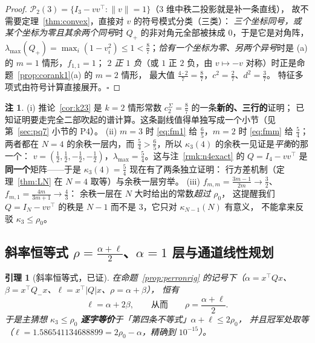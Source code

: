 \documentclass[UTF8,11pt]{ctexart}
\newtheorem{lemma}[theorem]{引理}
\theoremstyle{definition}
\newtheorem{remark}[theorem]{注}
\begin{document}
\begin{proof}
$\mathcal P_2(3)=\{I_3-vv^\top:\|v\|=1\}$（$3$ 维中秩二投影就是补一条直线），
故不需要定理~\ref{thm:convex}，直接对 $v$ 的符号模式分类（三类）：
\emph{三个坐标同号，或某个坐标为零且其余两个同号}时 $Q_+$ 的非对角元全部被抹成 $0$，于是它是对角阵，
$\lambda_{\max}(Q_+)=\max_i(1-v_i^2)\le1<\frac87$；\emph{恰有一个坐标为零、另两个异号}时是 (a) 的 $m=1$ 情形，$f_{1,1}=1$；
\emph{$2$ 正 $1$ 负}（或 $1$ 正 $2$ 负，由 $v\mapsto-v$ 对称）时正是命题~\ref{prop:corank1}(a) 的 $m=2$ 情形，
最大值 $\frac{4\cdot2}{7}=\frac87$，$c^2=\frac27$、$d^2=\frac37$。
特征多项式由符号计算直接展开。$\square$
\end{proof}

\begin{remark}\label{rmk:k23read}
(i) 推论~\ref{cor:k23} 是 $k=2$ 情形常数 $c_2^\Sigma=\frac87$ 的一条\textbf{新的、三行的}证明；
已知证明要走完全二部吹起的谱计算。这条副线值得单独写成一个小节（见第~\ref{sec:pq7} 小节的 P4）。
(ii) $m=3$ 时 \eqref{eq:fm1} 给 $\frac65$，$m=2$ 时 \eqref{eq:fmm} 给 $\frac54$；
两者都在 $N=4$ 的余秩一层内，而 $\frac54>\frac65$，所以 $\kappa_3(4)$ 的余秩一见证是\emph{平衡}的那一个：
$v=(\frac12,\frac12,-\frac12,-\frac12)$，$\lambda_{\max}=\frac54$。这与注~\ref{rmk:n4exact} 的
$Q=I_4-vv^\top$ 是\textbf{同一个}矩阵——于是 $\kappa_3(4)=\frac54$ 现在有了两条独立证明：
行方差机制（定理~\ref{thm:LN} 在 $N=4$ 取等）与余秩一层穷举。
(iii) $f_{m,m}=\frac{3m-1}{2m}\to\frac32$、$f_{m,1}=\frac{4m}{3m+1}\to\frac43$：
余秩一层在 $N$ 大时给出的常数\emph{超过} $\rho_0$，
这提醒我们 $Q=I_N-vv^\top$ 的秩是 $N-1$ 而不是 $3$，它只对 $\kappa_{N-1}(N)$ 有意义，
不能拿来反驳 $\kappa_3\le\rho_0$。
\end{remark}

\subsection{斜率恒等式 $\rho=\frac{\alpha+\ell}2$、$\alpha=1$ 层与通道线性规划}\label{sec:slope1}

\begin{lemma}[斜率恒等式，已证]\label{lem:slope1}
在命题~\ref{prop:perronrig} 的记号下（$\alpha=x^\top Qx$、$\beta=x^\top Q_-x$、$\ell=x^\top|Q|x$、$\rho=\alpha+\beta$），
恒有
\begin{equation}\label{eq:slope1}
\ell=\alpha+2\beta,\qquad\text{从而}\qquad \rho=\frac{\alpha+\ell}2 .
\end{equation}
于是主猜想 $\kappa_3\le\rho_0$ \textbf{逐字等价}于「第四条不等式」$\alpha+\ell\le2\rho_0$，
并且冠军处取等（$\ell=1.586541134688899=2\rho_0-\alpha$，精确到 $10^{-15}$）。
\end{lemma}
\end{document}
